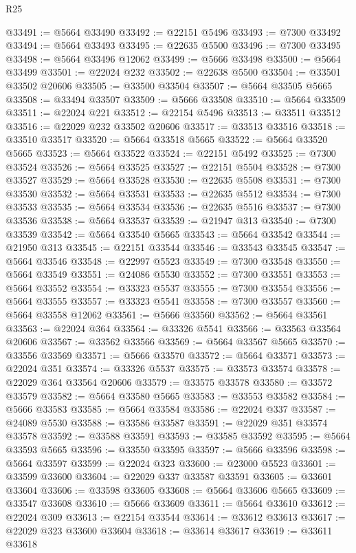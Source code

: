 \begin{lexlean}{R25}
\begin{coremodule}
@33491 := @5664 @33490
@33492 := @22151 @5496
@33493 := @7300 @33492
@33494 := @5664 @33493
@33495 := @22635 @5500
@33496 := @7300 @33495
@33498 := @5664 @33496 @12062
@33499 := @5666 @33498
@33500 := @5664 @33499
@33501 := @22024 @232
@33502 := @22638 @5500
@33504 := @33501 @33502 @20606
@33505 := @33500 @33504
@33507 := @5664 @33505 @5665
@33508 := @33494 @33507
@33509 := @5666 @33508
@33510 := @5664 @33509
@33511 := @22024 @221
@33512 := @22154 @5496
@33513 := @33511 @33512
@33516 := @22029 @232 @33502 @20606
@33517 := @33513 @33516
@33518 := @33510 @33517
@33520 := @5664 @33518 @5665
@33522 := @5664 @33520 @5665
@33523 := @5664 @33522
@33524 := @22151 @5492
@33525 := @7300 @33524
@33526 := @5664 @33525
@33527 := @22151 @5504
@33528 := @7300 @33527
@33529 := @5664 @33528
@33530 := @22635 @5508
@33531 := @7300 @33530
@33532 := @5664 @33531
@33533 := @22635 @5512
@33534 := @7300 @33533
@33535 := @5664 @33534
@33536 := @22635 @5516
@33537 := @7300 @33536
@33538 := @5664 @33537
@33539 := @21947 @313
@33540 := @7300 @33539
@33542 := @5664 @33540 @5665
@33543 := @5664 @33542
@33544 := @21950 @313
@33545 := @22151 @33544
@33546 := @33543 @33545
@33547 := @5664 @33546
@33548 := @22997 @5523
@33549 := @7300 @33548
@33550 := @5664 @33549
@33551 := @24086 @5530
@33552 := @7300 @33551
@33553 := @5664 @33552
@33554 := @33323 @5537
@33555 := @7300 @33554
@33556 := @5664 @33555
@33557 := @33323 @5541
@33558 := @7300 @33557
@33560 := @5664 @33558 @12062
@33561 := @5666 @33560
@33562 := @5664 @33561
@33563 := @22024 @364
@33564 := @33326 @5541
@33566 := @33563 @33564 @20606
@33567 := @33562 @33566
@33569 := @5664 @33567 @5665
@33570 := @33556 @33569
@33571 := @5666 @33570
@33572 := @5664 @33571
@33573 := @22024 @351
@33574 := @33326 @5537
@33575 := @33573 @33574
@33578 := @22029 @364 @33564 @20606
@33579 := @33575 @33578
@33580 := @33572 @33579
@33582 := @5664 @33580 @5665
@33583 := @33553 @33582
@33584 := @5666 @33583
@33585 := @5664 @33584
@33586 := @22024 @337
@33587 := @24089 @5530
@33588 := @33586 @33587
@33591 := @22029 @351 @33574 @33578
@33592 := @33588 @33591
@33593 := @33585 @33592
@33595 := @5664 @33593 @5665
@33596 := @33550 @33595
@33597 := @5666 @33596
@33598 := @5664 @33597
@33599 := @22024 @323
@33600 := @23000 @5523
@33601 := @33599 @33600
@33604 := @22029 @337 @33587 @33591
@33605 := @33601 @33604
@33606 := @33598 @33605
@33608 := @5664 @33606 @5665
@33609 := @33547 @33608
@33610 := @5666 @33609
@33611 := @5664 @33610
@33612 := @22024 @309
@33613 := @22154 @33544
@33614 := @33612 @33613
@33617 := @22029 @323 @33600 @33604
@33618 := @33614 @33617
@33619 := @33611 @33618

\end{coremodule}
\end{lexlean}

